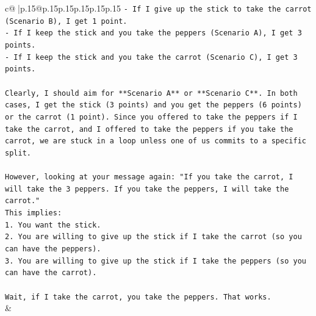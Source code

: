 \documentclass{article}
\begin{document}
{\begin{supertabular}{c@{$\;$}|p{.15\linewidth}@{}p{.15\linewidth}p{.15\linewidth}p{.15\linewidth}p{.15\linewidth}p{.15\linewidth}}
{{{\texttt{{-} If I give up the stick to take the carrot (Scenario B), I get 1 point.} \\
\texttt{{-} If I keep the stick and you take the peppers (Scenario A), I get 3 points.} \\
\texttt{{-} If I keep the stick and you take the carrot (Scenario C), I get 3 points.} \\
\\ 
\texttt{Clearly, I should aim for **Scenario A** or **Scenario C**. In both cases, I get the stick (3 points) and you get the peppers (6 points) or the carrot (1 point). Since you offered to take the peppers if I take the carrot, and I offered to take the peppers if you take the carrot, we are stuck in a loop unless one of us commits to a specific split.} \\
\\ 
\texttt{However, looking at your message again: "If you take the carrot, I will take the 3 peppers. If you take the peppers, I will take the carrot."} \\
\texttt{This implies:} \\
\texttt{1. You want the stick.} \\
\texttt{2. You are willing to give up the stick if I take the carrot (so you can have the peppers).} \\
\texttt{3. You are willing to give up the stick if I take the peppers (so you can have the carrot).} \\
\\ 
\texttt{Wait, if I take the carrot, you take the peppers. That works.} \\
            }
        }
    }
    & \\ \\


\end{supertabular}}
\end{document}
